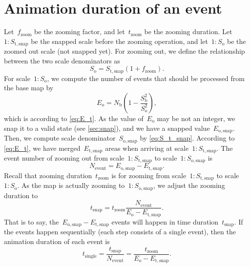 \documentclass[]{interact}
\begin{document}
\section{Animation duration of an event}
\label{appx:animation_duration_event}

Let~$f_\mathrm{zoom}$ be the zooming factor, and 
let~$t_\mathrm{zoom}$ be the zooming duration.
Let~$1:S_\mathrm{t,snap}$ be the snapped scale before the zooming operation, and 
let~$1:S_\mathrm{o}$ be the zoomed out scale (not snapped yet).
For zooming out, we define the relationship 
between the two scale denominators as
\begin{equation}
\label{eq:S_o}
S_\mathrm{o} = S_\mathrm{t,snap} (1 + f_\mathrm{zoom}).
\end{equation}
For scale~$1:S_\mathrm{o}$, we compute the number of events
that should be processed from the base map by
\begin{equation*}
\label{eq:E_o}
E_\mathrm{o} = N_\mathrm{b} \left(1-\frac{S^2_\mathrm{b}}{S^2_\mathrm{o}}\right),
\end{equation*}
which is according to \eq\ref{eq:E_t}.
As the value of~$E_\mathrm{o}$ may be not an integer, 
we snap it to a valid state
(see \sect\ref{sec:snap}),
and we have a snapped value~$E_\mathrm{o,snap}$.
Then, we compute scale denominator~$S_\mathrm{o,snap}$
by \eq\ref{eq:S_t_snap}.
According to \eq\ref{eq:E_t}, we have merged~$E_\mathrm{t,snap}$ areas 
when arriving at scale~$1:S_\mathrm{t,snap}$.
The event number of zooming out
from scale~$1:S_\mathrm{t,snap}$ to scale~$1:S_\mathrm{o,snap}$ is
\begin{equation*}
\label{eq:N_event}
N_\mathrm{event} = 
E_\mathrm{o,snap} - E_\mathrm{t,snap}.
\end{equation*}
Recall that zooming duration~$t_\mathrm{zoom}$ is for zooming 
from scale~$1:S_\mathrm{t,snap}$ to scale~$1:S_\mathrm{o}$.
As the map is actually zooming to~$1:S_\mathrm{o,snap}$,
we adjust the zooming duration to
\begin{equation*}
\label{eq:E_i}
t_\mathrm{snap}= t_\mathrm{zoom} 
\frac{N_\mathrm{event}}
{E_\mathrm{o} - E_\mathrm{t,snap}}.
\end{equation*}
That is to say, the~$E_\mathrm{o,snap} - E_\mathrm{t,snap}$ events will happen 
in time duration~$t_\mathrm{snap}$.
If the events happen sequentially (each step consists of a single event), 
then the animation duration of each event is
\begin{equation}
\label{eq:t_single}
t_\mathrm{single}   = \frac{t_\mathrm{snap}}{N_\mathrm{event}} 
                    = \frac{t_\mathrm{zoom}}{E_\mathrm{o} - E_\mathrm{t,snap}}.
\end{equation}
\end{document}
